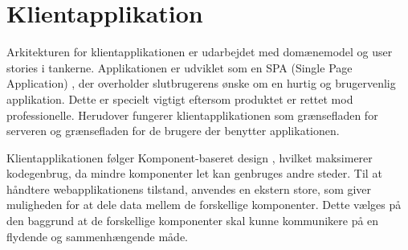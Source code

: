\section{Klientapplikation}

Arkitekturen for klientapplikationen er udarbejdet med domænemodel \cite[Domænemodel]{converge-terms} og user stories i tankerne. Applikationen er udviklet som en SPA (Single Page Application) \cite[SPA]{converge-terms}, der overholder slutbrugerens ønske om en hurtig og brugervenlig applikation. Dette er specielt vigtigt eftersom produktet er rettet mod professionelle. Herudover fungerer klientapplikationen som grænsefladen for serveren og grænsefladen for de brugere der benytter applikationen.

Klientapplikationen følger Komponent-baseret design \cite[Komponent-baseret design]{converge-terms}, hvilket maksimerer kodegenbrug, da mindre komponenter let kan genbruges andre steder. Til at håndtere webapplikationens tilstand, anvendes en ekstern store, som giver muligheden for at dele data mellem de forskellige komponenter. Dette vælges på den baggrund at de forskellige komponenter skal kunne kommunikere på en flydende og sammenhængende måde.


